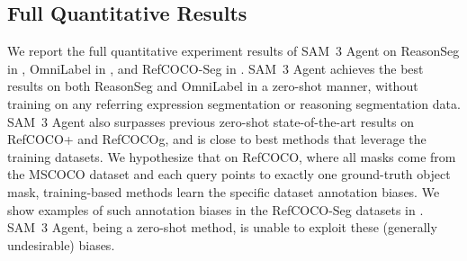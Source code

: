 \documentclass[]{fairmeta}
\newcommand{\model}{SAM~3\xspace}
\begin{document}
\subsection{Full Quantitative Results}

We report the full quantitative experiment results of \model Agent on ReasonSeg in , OmniLabel in , and RefCOCO-Seg in . \model Agent achieves the best results on both ReasonSeg and OmniLabel in a zero-shot manner, without training on any referring expression segmentation or reasoning segmentation data. \model Agent also surpasses previous zero-shot state-of-the-art results on RefCOCO+ and RefCOCOg, and is close to best methods that leverage the training datasets. We hypothesize that on RefCOCO, where all masks come from the MSCOCO dataset and each query points to exactly one ground-truth object mask, training-based methods learn the specific dataset annotation biases. We show examples of such annotation biases in the RefCOCO-Seg datasets in . \model Agent, being a zero-shot method, is unable to exploit these (generally undesirable) biases.
\end{document}
